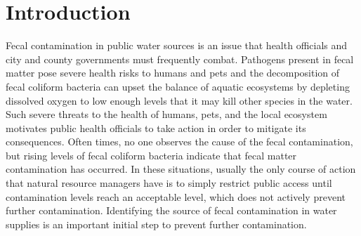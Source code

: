 \chapter{Introduction}\label{chap:introduction}
Fecal contamination in public water sources is an issue that health officials and city and county governments must frequently combat.
Pathogens present in fecal matter pose severe health risks to humans and pets
and
the decomposition of fecal coliform bacteria can upset the balance of aquatic ecosystems by depleting dissolved oxygen to low enough levels that it may kill other species in the water.
Such severe threats to the health of humans, pets, and the local ecosystem motivates public health officials to take action in order to mitigate its consequences.
Often times, no one observes the cause of the fecal contamination, but rising levels of fecal coliform bacteria indicate that fecal matter contamination has occurred.
In these situations, usually the only course of action that natural resource managers have is to simply restrict public access until contamination levels reach an acceptable level, which does not actively prevent further contamination.
Identifying the source of fecal contamination in water supplies is an important initial step to prevent further contamination.

